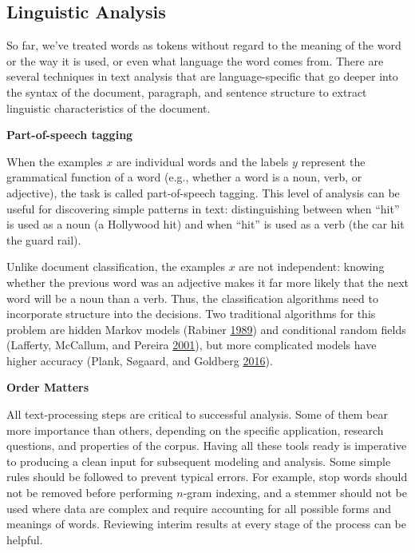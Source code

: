\documentclass[]{krantz}
\begin{document}
\subsection{Linguistic Analysis}\label{linguistic-analysis}

So far, we've treated words as tokens without regard to the meaning of
the word or the way it is used, or even what language the word comes
from. There are several techniques in text analysis that are
language-specific that go deeper into the syntax of the document,
paragraph, and sentence structure to extract linguistic characteristics
of the document.

\textbf{Part-of-speech tagging}

When the examples \(x\) are individual words and the labels \(y\)
represent the grammatical function of a word (e.g., whether a word is a
noun, verb, or adjective), the task is called part-of-speech tagging.
This level of analysis can be useful for discovering simple patterns in
text: distinguishing between when ``hit'' is used as a noun (a Hollywood
hit) and when ``hit'' is used as a verb (the car hit the guard rail).

Unlike document classification, the examples \(x\) are not independent:
knowing whether the previous word was an adjective makes it far more
likely that the next word will be a noun than a verb. Thus, the
classification algorithms need to incorporate structure into the
decisions. Two traditional algorithms for this problem are hidden Markov
models (Rabiner \protect\hyperlink{ref-rabiner-89}{1989}) and
conditional random fields (Lafferty, McCallum, and Pereira
\protect\hyperlink{ref-lafferty-01}{2001}), but more complicated models
have higher accuracy (Plank, Søgaard, and Goldberg
\protect\hyperlink{ref-plank-16}{2016}).

\textbf{Order Matters}

All text-processing steps are critical to successful analysis. Some of
them bear more importance than others, depending on the specific
application, research questions, and properties of the corpus. Having
all these tools ready is imperative to producing a clean input for
subsequent modeling and analysis. Some simple rules should be followed
to prevent typical errors. For example, stop words should not be removed
before performing \(n\)-gram indexing, and a stemmer should not be used
where data are complex and require accounting for all possible forms and
meanings of words. Reviewing interim results at every stage of the
process can be helpful.
\end{document}
